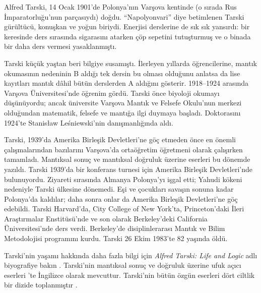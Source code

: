 




Alfred Tarski, 14 Ocak 1901'de Polonya'nın Varşova kentinde (o sırada Rus
İmparatorluğu'nun parçasıydı) doğdu. ``Napolyonvari'' diye betimlenen Tarski
gürültücü, konuşkan ve yoğun biriydi. Enerjisi derslerine de sık sık yansırdı:
bir keresinde ders sırasında sigarasını atarken çöp sepetini tutuşturmuş ve o
binada bir daha ders vermesi yasaklanmıştı.

Tarski küçük yaştan beri bilgiye susamıştı. İlerleyen yıllarda öğrencilerine,
mantık okumasının nedeninin B aldığı tek dersin bu olması olduğunu anlatsa da
lise kayıtları mantık dâhil bütün derslerden A aldığını gösterir. 1918--1924
arasında Varşova Üniversitesi'nde öğrenim gördü. Tarski önce biyoloji okumayı
düşünüyordu; ancak üniversite Varşova Mantık ve Felsefe Okulu'nun merkezi
olduğundan matematik, felsefe ve mantığa ilgi duymaya başladı. Doktorasını
1924'te Stanis\l{}aw Le\'{s}niewski'nin danışmanlığında aldı.

Tarski, 1939'da Amerika Birleşik Devletleri'ne göç etmeden önce en önemli
çalışmalarından bazılarını Varşova'da ortaöğretim öğretmeni olarak çalışırken
tamamladı. Mantıksal sonuç ve mantıksal doğruluk üzerine eserleri bu dönemde
yazıldı. Tarski 1939'da bir konferans turnesi için Amerika Birleşik
Devletleri'nde bulunuyordu. Ziyareti sırasında Almanya Polonya'yı işgal etti;
Yahudi kökeni nedeniyle Tarski ülkesine dönemedi. Eşi ve çocukları savaşın
sonuna kadar Polonya'da kaldılar; daha sonra onlar da Amerika Birleşik
Devletleri'ne göç edebildi. Tarski Harvard'da, City College of New York'ta,
Princeton'daki İleri Araştırmalar Enstitüsü'nde ve son olarak Berkeley'deki
California Üniversitesi'nde ders verdi. Berkeley'de disiplinlerarası Mantık
ve Bilim Metodolojisi programını kurdu. Tarski 26 Ekim 1983'te 82 yaşında
öldü.

\begin{reading} 
Tarski'nin yaşamı hakkında daha fazla bilgi için \emph{Alfred Tarski: Life
  and Logic} adlı biyografiye bakın \citep{Feferman2004}. Tarski'nin mantıksal
sonuç ve doğruluk üzerine ufuk açıcı eserleri \citep{Tarski1983}'te İngilizce
olarak mevcuttur. Tarski'nin bütün özgün eserleri dört ciltlik bir dizide
toplanmıştır \citep{Tarski1981}.
\end{reading}

